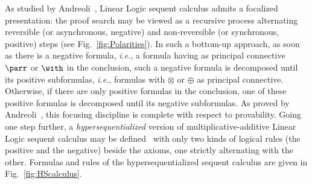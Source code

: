 \documentclass{LMCS}
\def\ie{{\em i.e.}}
\begin{document}
As studied by Andreoli~\cite{DBLP:journals/logcom/Andreoli92}, Linear Logic sequent calculus admits a focalized presentation:
the proof search may be viewed as a recursive process alternating reversible (or asynchronous, negative) and non-reversible (or synchronous, positive) steps (see Fig.~\ref{fig:Polarities}). 
In such a bottom-up approach, as soon as there is a negative formula, \ie, a formula having as principal connective $\parr$ or $\with$ in the conclusion, such a negative formula is decomposed until its positive subformulas, \ie, formulas with 
$\otimes$ or $\oplus$ as principal connective. Otherwise, if there are only positive formulas in the conclusion, one of these positive formulas is decomposed until its negative subformulas. As proved by Andreoli~\cite{DBLP:journals/logcom/Andreoli92}, this focusing discipline is complete with respect to provability.
Going one step further, a {\em hypersequentialized} version of multiplicative-additive Linear Logic sequent calculus may be defined~\cite{DBLP:journals/logcom/Andreoli92,girard00,DBLP:journals/iandc/CurienF12} with only  two kinds of logical rules (the positive and the negative) beside the axioms, one strictly alternating with the other.
Formulas  and rules of the hypersequentialized sequent calculus are given in Fig.~\ref{fig:HScalculus}.
\end{document}
